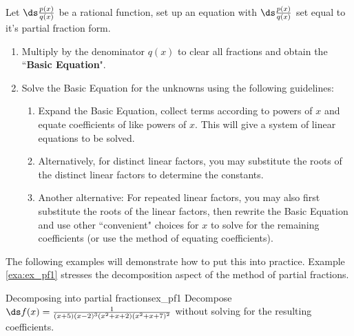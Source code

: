 \begin{formulabox} \label{idea:partial_fraction2}
Let $\ds \frac{p(x)}{q(x)}$ be a rational function, set up an equation with $\ds \frac{p(x)}{q(x)}$ set equal to it's partial fraction form.
\begin{enumerate}
	\item	Multiply by the denominator $ q(x) $ to clear all fractions and obtain the 	``\textbf{Basic Equation}".
	
	\item	Solve the Basic Equation for the unknowns using the following guidelines:
	
	\begin{enumerate}
	\item Expand the Basic Equation, collect terms according to powers of $ x $ and equate coefficients of like powers of $ x $. This will give a system of linear equations to be solved.
	\item	Alternatively, for distinct linear factors, you may substitute the roots of the distinct linear factors
	to determine the constants.
	\item Another alternative: For repeated linear factors, you may also first substitute the roots of the linear factors, then rewrite the Basic Equation and use other “convenient" choices for $ x $ to solve for the remaining
	coefficients (or use the method of equating coefficients).
	\end{enumerate}
\end{enumerate}	
\end{formulabox}



The following examples will demonstrate how to put this into practice. Example \ref{exa:ex_pf1} stresses the decomposition aspect of the method of partial fractions.\\

\begin{example}{Decomposing into partial fractions}{ex_pf1}
{
Decompose $\ds f(x)=\frac{1}{(x+5)(x-2)^3(x^2+x+2)(x^2+x+7)^2}$ without solving for the resulting coefficients.}
\end{example}


